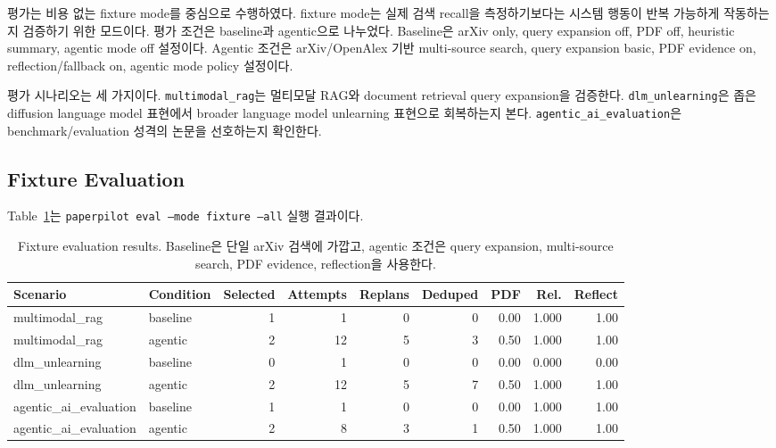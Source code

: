\documentclass[sigconf,nonacm]{acmart}
\begin{document}
평가는 비용 없는 fixture mode를 중심으로 수행하였다. fixture mode는 실제 검색 recall을 측정하기보다는 시스템 행동이 반복 가능하게 작동하는지 검증하기 위한 모드이다. 평가 조건은 baseline과 agentic으로 나누었다. Baseline은 arXiv only, query expansion off, PDF off, heuristic summary, agentic mode off 설정이다. Agentic 조건은 arXiv/OpenAlex 기반 multi-source search, query expansion basic, PDF evidence on, reflection/fallback on, agentic mode policy 설정이다.

평가 시나리오는 세 가지이다. \texttt{multimodal\_rag}는 멀티모달 RAG와 document retrieval query expansion을 검증한다. \texttt{dlm\_unlearning}은 좁은 diffusion language model 표현에서 broader language model unlearning 표현으로 회복하는지 본다. \texttt{agentic\_ai\_evaluation}은 benchmark/evaluation 성격의 논문을 선호하는지 확인한다.

\subsection{Fixture Evaluation}

Table~\ref{tab:fixture-results}는 \texttt{paperpilot eval --mode fixture --all} 실행 결과이다.

\begin{table}[t]
  \centering
  \caption{Fixture evaluation results. Baseline은 단일 arXiv 검색에 가깝고, agentic 조건은 query expansion, multi-source search, PDF evidence, reflection을 사용한다.}
  \label{tab:fixture-results}
  \small
  \begin{tabular}{llrrrrrrr}
    \toprule
    Scenario & Condition & Selected & Attempts & Replans & Deduped & PDF & Rel. & Reflect \\
    \midrule
    multimodal\_rag & baseline & 1 & 1 & 0 & 0 & 0.00 & 1.000 & 1.00 \\
    multimodal\_rag & agentic & 2 & 12 & 5 & 3 & 0.50 & 1.000 & 1.00 \\
    dlm\_unlearning & baseline & 0 & 1 & 0 & 0 & 0.00 & 0.000 & 0.00 \\
    dlm\_unlearning & agentic & 2 & 12 & 5 & 7 & 0.50 & 1.000 & 1.00 \\
    agentic\_ai\_evaluation & baseline & 1 & 1 & 0 & 0 & 0.00 & 1.000 & 1.00 \\
    agentic\_ai\_evaluation & agentic & 2 & 8 & 3 & 1 & 0.50 & 1.000 & 1.00 \\
    \bottomrule
  \end{tabular}
\end{table}
\end{document}
